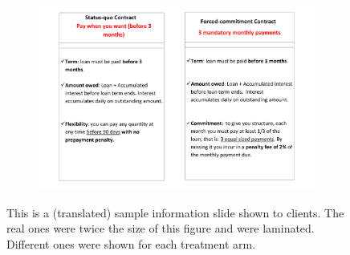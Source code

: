 \documentclass[oneside,11pt]{article}
\begin{document}
\begin{figure}[H]
     \caption{Explanatory Material}
    \label{ExplanatoryMaterial}
    \begin{center}
    \begin{subfigure}{\textwidth}
        \centering
        \includegraphics[width=\textwidth]{Figuras/micas.pdf}
    \end{subfigure}
    \end{center}
    \scriptsize
        This is a (translated) sample information slide shown to clients. The real ones were twice the size of this figure and were laminated. Different ones were shown for each treatment arm.
\end{figure}







\cleardoublepage







\cleardoublepage

\end{document}
